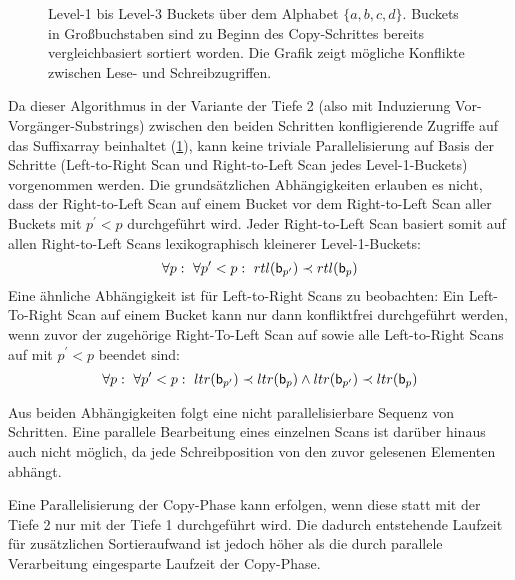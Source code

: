 {\begin{landscape}
\begin{figure}[p]
{
            }
            \caption[Parallelisierbarkeit der Copy-Technik]{Level-1 bis Level-3 Buckets über dem Alphabet \(\{a, b, c, d\}\).
            Buckets in Großbuchstaben sind zu Beginn des Copy-Schrittes bereits vergleichbasiert sortiert worden.
            Die Grafik zeigt mögliche Konflikte zwischen Lese- und Schreibzugriffen.}
            \label{fig:seward:parallel}
        \end{figure}
    \end{landscape}
}
Da dieser Algorithmus in der Variante der Tiefe 2 (also mit Induzierung Vor-Vorgänger-Substrings) zwischen den beiden Schritten konfligierende Zugriffe auf das Suffixarray beinhaltet (\cref{fig:seward:parallel}), kann keine triviale Parallelisierung auf Basis der Schritte (Left-to-Right Scan und Right-to-Left Scan jedes Level-1-Buckets) vorgenommen werden.
Die grundsätzlichen Abhängigkeiten erlauben es nicht, dass der Right-to-Left Scan  auf einem Bucket  vor dem Right-to-Left Scan aller Buckets  mit \(p^\prime < p\) durchgeführt wird.
Jeder Right-to-Left Scan basiert somit auf allen Right-to-Left Scans lexikographisch kleinerer Level-1-Buckets:
\[\forall p:~\forall p^\prime < p:~rtl(\mathsf{b}_{p^\prime}) \prec rtl(\mathsf{b}_{p})\]
Eine ähnliche Abhängigkeit ist für Left-to-Right Scans zu beobachten: Ein Left-To-Right Scan  auf einem Bucket  kann nur dann konfliktfrei durchgeführt werden, wenn zuvor der zugehörige Right-To-Left Scan auf  sowie alle Left-to-Right Scans auf  mit \(p^\prime < p\) beendet sind:
\[\forall p:~\forall p^\prime < p:~ltr(\mathsf{b}_{p^\prime}) \prec ltr(\mathsf{b}_{p}) \wedge ltr(\mathsf{b}_{p^\prime}) \prec ltr(\mathsf{b}_{p})\]\par
Aus beiden Abhängigkeiten folgt eine nicht parallelisierbare Sequenz von Schritten. Eine parallele Bearbeitung eines einzelnen Scans ist darüber hinaus auch nicht möglich, da jede Schreibposition von den zuvor gelesenen Elementen abhängt.\par\medskip
Eine Parallelisierung der Copy-Phase kann erfolgen, wenn diese statt mit der Tiefe 2 nur mit der Tiefe 1 durchgeführt wird. Die dadurch entstehende Laufzeit für zusätzlichen Sortieraufwand ist jedoch höher als die durch parallele Verarbeitung eingesparte Laufzeit der Copy-Phase.
